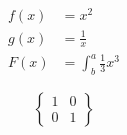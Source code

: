 \documentclass{article}
\begin{document}
\begin{align*}
f(x) &= x^2\\
g(x) &= \frac{1}{x}\\
F(x) &= \int^a_b \frac{1}{3}x^3
\end{align*}



\[\left\{\begin{matrix}
    1 & 0\\
    0 & 1
    \end{matrix}\right\}\]
\end{document}
